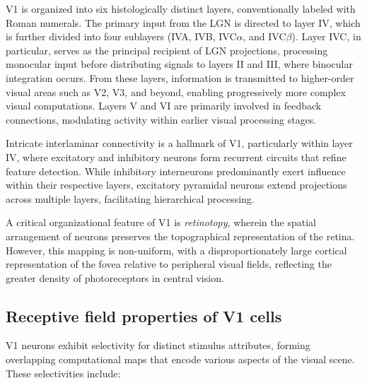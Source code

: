 V1 is organized into six histologically distinct layers, conventionally labeled with 
Roman numerals. The primary input from the LGN is directed to layer IV, which is 
further divided into four sublayers (IVA, IVB, IVC$\alpha$, and IVC$\beta$). Layer IVC, 
in particular, serves as the principal recipient of LGN projections, processing 
monocular input before distributing signals to layers II and III, where binocular 
integration occurs. From these layers, information is transmitted to higher-order 
visual areas such as V2, V3, and beyond, enabling progressively more complex visual 
computations. Layers V and VI are primarily involved in feedback connections, 
modulating activity within earlier visual processing stages.

Intricate interlaminar connectivity is a hallmark of V1, particularly within layer IV, 
where excitatory and inhibitory neurons form recurrent circuits that refine feature 
detection. While inhibitory interneurons predominantly exert influence within their 
respective layers, excitatory pyramidal neurons extend projections across multiple 
layers, facilitating hierarchical processing.

A critical organizational feature of V1 is \emph{retinotopy}, wherein the spatial 
arrangement of neurons preserves the topographical representation of the retina. 
However, this mapping is non-uniform, with a disproportionately large cortical 
representation of the fovea relative to peripheral visual fields, reflecting the 
greater density of photoreceptors in central vision.

\subsection{Receptive field properties of V1 cells}
\label{subsec:receptive_field}
V1 neurons exhibit selectivity for distinct stimulus attributes, forming 
overlapping computational maps that encode various aspects of the visual scene. 
These selectivities include:

